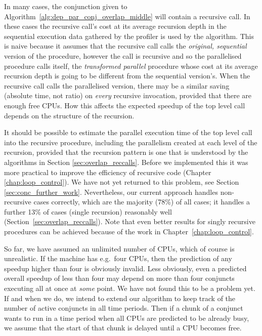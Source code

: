In many cases,
the conjunction given to Algorithm~\ref{alg:dep_par_conj_overlap_middle}
will contain a recursive call.
In these cases the recursive call's cost at its average recursion depth in the
sequential execution data gathered by the profiler is used by the
algorithm.
This is naive because it assumes that the recursive call
calls the \emph{original, sequential} version of the procedure,
however the call is recursive and so the parallelised procedure calls itself,
the \emph{transformed parallel} procedure whose cost at its average recursion
depth is going to be different from the sequential version's.
When the recursive call calls the parallelised version,
there may be a similar saving 
(absolute time, not ratio)
on \emph{every} recursive invocation,
provided that there are enough free CPUs.
How this affects the expected speedup of the top level call
depends on the structure of the recursion.

It should be possible to estimate the parallel execution time of the top level
call into the recursive procedure,
including the parallelism created at each level of the recursion,
provided that
the recursion pattern is one that is understood by the algorithms in
Section \ref{sec:overlap_reccalls}.
Before we implemented this it was more practical to improve the efficiency of
recursive code
(Chapter \ref{chap:loop_control}).
We have not yet returned to this problem,
see Section \ref{sec:conc_further_work}.
Nevertheless,
our current approach handles non-recursive cases correctly,
which are the majority (78\%) of all cases;
it handles a further 13\% of cases (single recursion) reasonably well
(Section~\ref{sec:overlap_reccalls}).
Note that even better results for singly recursive procedures can be
achieved because of the work in Chapter~\ref{chap:loop_control}.

So far, we have assumed an unlimited number of CPUs,
which of course is unrealistic.
If the machine has e.g.\ four CPUs,
then the prediction of any speedup higher than four is obviously invalid.
Less obviously,
even a predicted overall speedup of less than four may depend
on more than four conjuncts executing all at once at \emph{some} point.
We have not found this to be a problem yet.
If and when we do,
we intend to extend our algorithm to keep track
of the number of active conjuncts in all time periods.
Then if a chunk of a conjunct wants to run in a time period
when all CPUs are predicted to be already busy,
we assume that the start of that chunk is delayed until a CPU becomes free.

